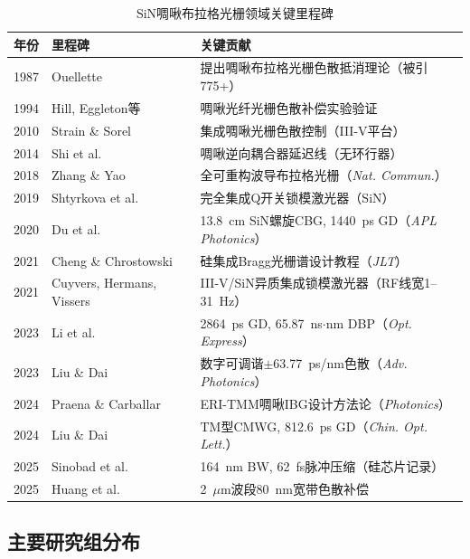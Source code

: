 \documentclass[12pt,a4paper,twoside]{article}
\begin{document}
\begin{table}[h]
\centering
\caption{SiN啁啾布拉格光栅领域关键里程碑}
\label{tab:summary}
\begin{tabular}{clp{8cm}}
\toprule
\textbf{年份} & \textbf{里程碑} & \textbf{关键贡献} \\
\midrule
1987 & Ouellette~\cite{ouellette1987} & 提出啁啾布拉格光栅色散抵消理论（被引775+） \\
1994 & Hill, Eggleton等~\cite{hill1994,eggleton1994} & 啁啾光纤光栅色散补偿实验验证 \\
2010 & Strain \& Sorel~\cite{strain2010} & 集成啁啾光栅色散控制（III-V平台） \\
2014 & Shi et al.~\cite{shi2014} & 啁啾逆向耦合器延迟线（无环行器） \\
2018 & Zhang \& Yao~\cite{zhang2018} & 全可重构波导布拉格光栅（\textit{Nat. Commun.}） \\
2019 & Shtyrkova et al.~\cite{shtyrkova2019} & 完全集成Q开关锁模激光器（SiN） \\
2020 & Du et al.~\cite{du2020} & 13.8~cm SiN螺旋CBG, 1440~ps GD（\textit{APL Photonics}） \\
2021 & Cheng \& Chrostowski~\cite{cheng2021} & 硅集成Bragg光栅谱设计教程（\textit{JLT}） \\
2021 & Cuyvers, Hermans, Vissers~\cite{cuyvers2021,hermans2021,vissers2021} & III-V/SiN异质集成锁模激光器（RF线宽1--31~Hz） \\
2023 & Li et al.~\cite{li2023} & 2864~ps GD, 65.87~ns$\cdot$nm DBP（\textit{Opt. Express}） \\
2023 & Liu \& Dai~\cite{liu2023advphoton} & 数字可调谐$\pm$63.77~ps/nm色散（\textit{Adv. Photonics}） \\
2024 & Praena \& Carballar~\cite{praena2024} & ERI-TMM啁啾IBG设计方法论（\textit{Photonics}） \\
2024 & Liu \& Dai~\cite{liu2024col} & TM型CMWG, 812.6~ps GD（\textit{Chin. Opt. Lett.}） \\
2025 & Sinobad et al.~\cite{sinobad2025} & 164~nm BW, 62~fs脉冲压缩（硅芯片记录） \\
2025 & Huang et al.~\cite{huang2025} & 2~$\mu$m波段80~nm宽带色散补偿 \\
\bottomrule
\end{tabular}
\end{table}

\subsection{主要研究组分布}
\end{document}
